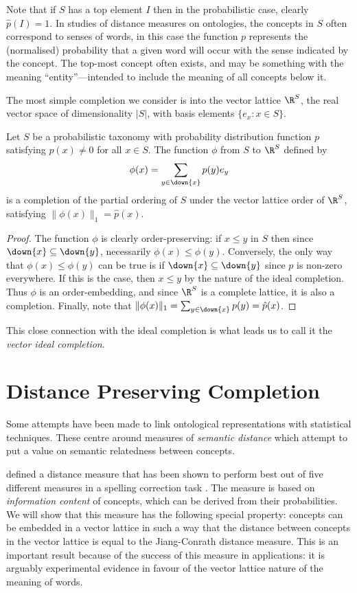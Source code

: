 Note that if $S$ has a top element $I$ then in the probabilistic case, clearly $\hat{p}(I) = 1$. In studies of distance measures on ontologies, the concepts in $S$ often correspond to senses of words, in this case the function $p$ represents the (normalised) probability that a given word will occur with the sense indicated by the concept. The top-most concept often exists, and may be something with the meaning ``entity''---intended to include the meaning of all concepts below it.

The most simple completion we consider is into the vector lattice $\R^S$, the real vector space of dimensionality $|S|$, with basis elements $\{e_x : x\in S\}$.
\begin{prop}
Let $S$ be a probabilistic taxonomy with probability distribution function $p$ satisfying $p(x) \neq 0$ for all $x \in S$. The function $\phi$ from $S$ to $\R^S$ defined by
$$\phi(x) = \sum_{y \in \down{x}} p(y)e_y$$
is a completion of the partial ordering of $S$ under the vector lattice order of $\R^S$, satisfying $\|\phi(x)\|_1 = \hat{p}(x)$.
\end{prop}
\begin{proof}
The function $\phi$ is clearly order-preserving: if $x \le y$ in $S$ then since $\down{x} \subseteq \down{y}$, necessarily $\phi(x) \le \phi(y)$. Conversely, the only way that $\phi(x) \le \phi(y)$ can be true is if $\down{x} \subseteq \down{y}$ since $p$ is non-zero everywhere. If this is the case, then $x \le y$ by the nature of the ideal completion. Thus $\phi$ is an order-embedding, and since $\R^S$ is a complete lattice, it is also a completion. Finally, note that $\|\phi(x)\|_1 = \sum_{y\in\down{x}} p(y) = \hat{p}(x)$.
\end{proof}
This close connection with the ideal completion is what leads us to call it the \emph{vector ideal completion}.


\section{Distance Preserving Completion}
\label{distance}

Some attempts have been made to link ontological representations with statistical techniques. These centre around measures of \emph{semantic distance} which attempt to put a value on semantic relatedness between concepts.

\cite{Jiang:97} defined a distance measure that has been shown to perform best out of five different measures in a spelling correction task \citep{Budanitsky:06}. The measure is based on \emph{information content} of concepts, which can be derived from their probabilities. We will show that this measure has the following special property: concepts can be embedded in a vector lattice in such a way that the distance between concepts in the vector lattice is equal to the Jiang-Conrath distance measure. This is an important result because of the success of this measure in applications: it is arguably experimental evidence in favour of the vector lattice nature of the meaning of words.

